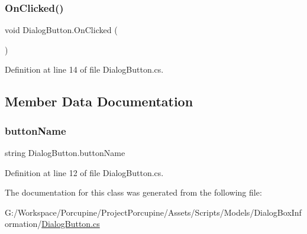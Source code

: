 \subsubsection{\texorpdfstring{On\+Clicked()}{OnClicked()}}
{\footnotesize\ttfamily void Dialog\+Button.\+On\+Clicked (\begin{DoxyParamCaption}{ }\end{DoxyParamCaption})}



Definition at line 14 of file Dialog\+Button.\+cs.



\subsection{Member Data Documentation}
\mbox{\label{class_dialog_button_a16f68c40934b4d891eafbb0c0d8fd4d2}} 
\subsubsection{\texorpdfstring{button\+Name}{buttonName}}
{\footnotesize\ttfamily string Dialog\+Button.\+button\+Name}



Definition at line 12 of file Dialog\+Button.\+cs.



The documentation for this class was generated from the following file\+:\begin{DoxyCompactItemize}
\item 
G\+:/\+Workspace/\+Porcupine/\+Project\+Porcupine/\+Assets/\+Scripts/\+Models/\+Dialog\+Box\+Information/\hyperlink{_dialog_button_8cs}{Dialog\+Button.\+cs}\end{DoxyCompactItemize}
